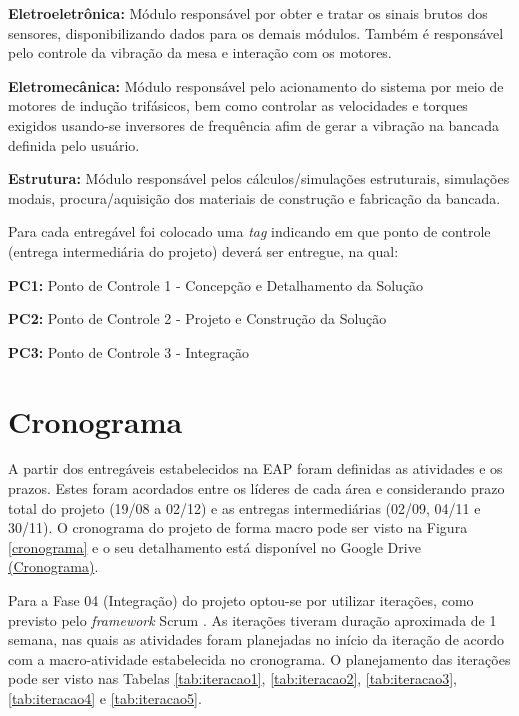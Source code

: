 \textbf{Eletroeletrônica:} Módulo responsável por obter e tratar os sinais brutos dos sensores, disponibilizando dados para os demais módulos. Também é responsável pelo controle da vibração da mesa e interação com os motores.

\textbf{Eletromecânica:} Módulo responsável pelo acionamento do sistema por meio de motores de indução trifásicos, bem como controlar as velocidades e torques exigidos usando-se inversores de frequência afim de gerar a vibração na bancada definida pelo usuário.

\textbf{Estrutura:} Módulo responsável pelos cálculos/simulações estruturais, simulações modais, procura/aquisição dos materiais de construção e fabricação da bancada.

Para cada entregável foi colocado uma \textit{tag} indicando em que ponto de controle (entrega intermediária do projeto) deverá ser entregue, na qual:

\indent \textbf{PC1:} Ponto de Controle 1 - Concepção e Detalhamento da Solução

\indent \textbf{PC2:} Ponto de Controle 2 - Projeto e Construção da Solução

\indent \textbf{PC3:} Ponto de Controle 3 - Integração

\section*{Cronograma}

A partir dos entregáveis estabelecidos na EAP foram definidas as atividades e os prazos. Estes foram acordados entre os líderes de
cada área e considerando prazo total do projeto (19/08 a 02/12) e as entregas intermediárias (02/09, 04/11 e 30/11).
O cronograma do projeto de forma macro pode ser visto na Figura \ref{cronograma} e o seu detalhamento está disponível
no Google Drive \href{https://drive.google.com/file/d/0B28JW3Vcm0jLdElSSGNPcU4yVEU/view?usp=sharing}{(Cronograma)}.

Para a Fase 04 (Integração) do projeto optou-se por utilizar iterações, como previsto pelo
\textit{framework} Scrum \cite{scrum}.
As iterações tiveram duração aproximada de 1 semana,
nas quais as atividades foram planejadas no início da iteração de acordo
com a macro-atividade estabelecida no cronograma. O planejamento das iterações pode ser visto nas Tabelas \ref{tab:iteracao1},
\ref{tab:iteracao2}, \ref{tab:iteracao3}, \ref{tab:iteracao4} e \ref{tab:iteracao5}.

